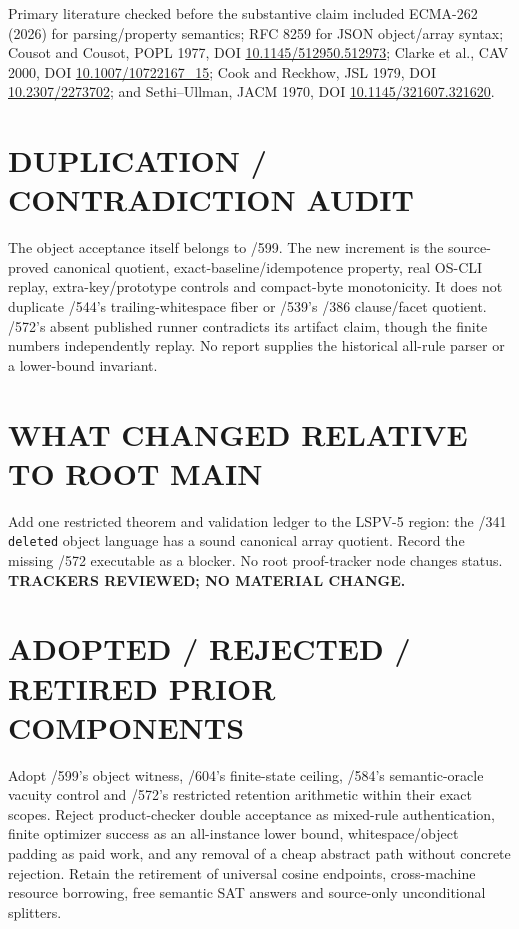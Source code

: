 \documentclass[11pt]{article}
\begin{document}
Primary literature checked before the substantive claim included ECMA-262
(2026) for parsing/property semantics; RFC 8259 for JSON object/array syntax;
Cousot and Cousot, POPL 1977, DOI \href{https://doi.org/10.1145/512950.512973}{10.1145/512950.512973};
Clarke et al., CAV 2000, DOI \href{https://doi.org/10.1007/10722167_15}{10.1007/10722167\_15};
Cook and Reckhow, JSL 1979, DOI \href{https://doi.org/10.2307/2273702}{10.2307/2273702};
and Sethi--Ullman, JACM 1970, DOI \href{https://doi.org/10.1145/321607.321620}{10.1145/321607.321620}.

\section{DUPLICATION / CONTRADICTION AUDIT}

The object acceptance itself belongs to /599.  The new increment is the
source-proved canonical quotient, exact-baseline/idempotence property, real
OS-CLI replay, extra-key/prototype controls and compact-byte monotonicity.
It does not duplicate /544's trailing-whitespace fiber or /539's /386
clause/facet quotient.  /572's absent published runner contradicts its artifact
claim, though the finite numbers independently replay.  No report supplies the
historical all-rule parser or a lower-bound invariant.

\section{WHAT CHANGED RELATIVE TO ROOT MAIN}

Add one restricted theorem and validation ledger to the LSPV-5 region: the
/341 \texttt{deleted} object language has a sound canonical array quotient.
Record the missing /572 executable as a blocker.  No root proof-tracker node
changes status.  \textbf{TRACKERS REVIEWED; NO MATERIAL CHANGE.}

\section{ADOPTED / REJECTED / RETIRED PRIOR COMPONENTS}

Adopt /599's object witness, /604's finite-state ceiling, /584's semantic-oracle
vacuity control and /572's restricted retention arithmetic within their exact
scopes.  Reject product-checker double acceptance as mixed-rule authentication,
finite optimizer success as an all-instance lower bound, whitespace/object
padding as paid work, and any removal of a cheap abstract path without concrete
rejection.  Retain the retirement of universal cosine endpoints, cross-machine
resource borrowing, free semantic SAT answers and source-only unconditional
splitters.
\end{document}

